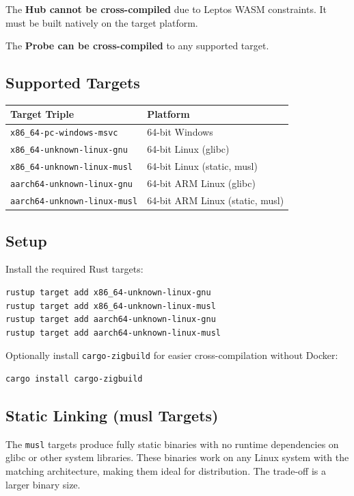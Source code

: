 \documentclass[12pt]{report}
\begin{document}
The \textbf{Hub cannot be cross-compiled} due to Leptos WASM constraints. It
must be built natively on the target platform.

The \textbf{Probe can be cross-compiled} to any supported target.

\subsection{Supported Targets}

\begin{longtable}{@{} l l @{}}
\toprule
\textbf{Target Triple} & \textbf{Platform} \\
\midrule
\texttt{x86\_64-pc-windows-msvc} & 64-bit Windows \\
\texttt{x86\_64-unknown-linux-gnu} & 64-bit Linux (glibc) \\
\texttt{x86\_64-unknown-linux-musl} & 64-bit Linux (static, musl) \\
\texttt{aarch64-unknown-linux-gnu} & 64-bit ARM Linux (glibc) \\
\texttt{aarch64-unknown-linux-musl} & 64-bit ARM Linux (static, musl) \\
\bottomrule
\end{longtable}

\subsection{Setup}

Install the required Rust targets:

\begin{lstlisting}
rustup target add x86_64-unknown-linux-gnu
rustup target add x86_64-unknown-linux-musl
rustup target add aarch64-unknown-linux-gnu
rustup target add aarch64-unknown-linux-musl
\end{lstlisting}

Optionally install \texttt{cargo-zigbuild} for easier cross-compilation
without Docker:

\begin{lstlisting}
cargo install cargo-zigbuild
\end{lstlisting}

\subsection{Static Linking (musl Targets)}

The \texttt{musl} targets produce fully static binaries with no runtime
dependencies on glibc or other system libraries. These binaries work on any
Linux system with the matching architecture, making them ideal for
distribution. The trade-off is a larger binary size.
\end{document}
